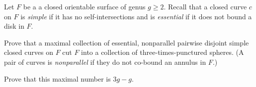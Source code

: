 Let $F$ be a a closed orientable surface of genus $g\geq 2$. Recall
that a closed curve $c$ on $F$ is \emph{simple} if it has no
self-intersections and is \emph{essential} if it does not bound a disk
in $F$.
\begin{alist}
\item Prove that a maximal collection of essential, nonparallel
pairwise disjoint simple closed curves on $F$ cut $F$ into a
collection of three-times-punctured spheres. (A pair of curves is
\emph{nonparallel} if they do not co-bound an annulus in $F$.)
\item Prove that this maximal number is $3g-g$. 
\end{alist}
